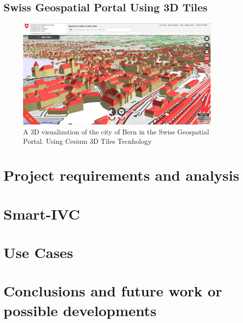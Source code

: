 \documentclass[]{usiinfbachelorproject}
\newcommand{\applicationName}{Smart-IVC}
\begin{document}
\subsection{Swiss Geospatial Portal Using 3D Tiles}
\begin{figure} [H]
\centering
\includegraphics[width=0.9\textwidth]{images/BernCitySwissTopo}
\caption{A 3D visualization of the city of Bern in the Swiss Geospatial Portal. Using Cesium 3D Tiles Tecnhology}
\label{fig:BernCitySwissTopo}
\end{figure}



\section{Project requirements and analysis} \label{projectRequirementsAndAnalysis}

\section{\applicationName} \label{projectDesign}

\section{Use Cases} \label{tests}

\section{Conclusions and future work or possible developments} \label{conclusions}


\end{document}
